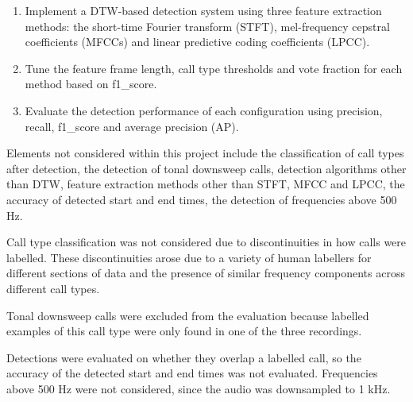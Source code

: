 \label{sec:objectives}

\begin{enumerate}
    \item Implement a \acs{DTW}-based detection system using three feature extraction methods: 
    the short-time Fourier transform (\acs{STFT}), mel-frequency cepstral coefficients (\acsp{MFCC}) and 
    linear predictive coding coefficients (\acs{LPCC}). 
    \item Tune the feature frame length, call type 
    thresholds and vote fraction for each method based on \gls{f1_score}.
    \item Evaluate the detection performance of each configuration using \gls{precision}, \gls{recall}, \gls{f1_score} 
    and average precision (\acs{AP}).
\end{enumerate}

\label{sec:scope}
    Elements not considered within this project include the classification of call types after 
    detection, the detection of tonal downsweep calls, detection algorithms other than \acs{DTW}, 
    feature extraction methods other than \acs{STFT}, \acs{MFCC} and \acs{LPCC}, the accuracy of 
    detected start and end times, the detection of frequencies above 500 Hz.

    Call type classification was not considered due to discontinuities in how calls were labelled. 
    These discontinuities arose due to a variety of 
    human labellers for different sections of data and the presence of similar frequency components 
    across different call types.

    Tonal downsweep calls were excluded from the evaluation because labelled examples of this call 
    type were only found in one of the three recordings.

    Detections were evaluated on whether they overlap a labelled call, so the accuracy of the detected 
    start and end times was not evaluated. Frequencies above 500 Hz were not considered, since the 
    audio was downsampled to 1 kHz.

\label{sec:layout}

